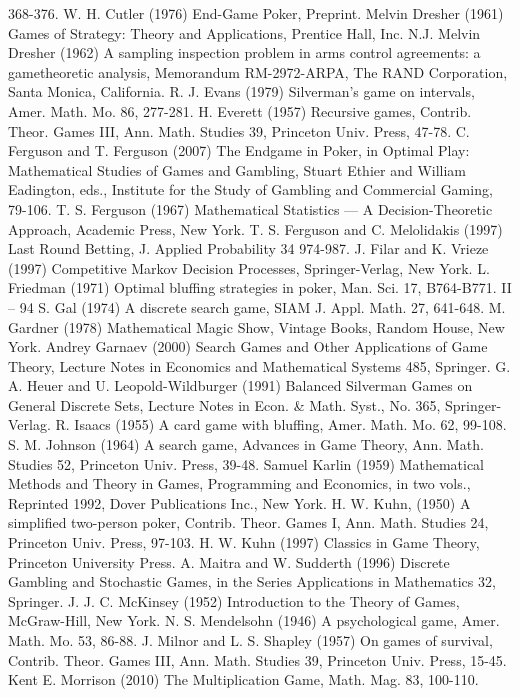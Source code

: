368-376.
W. H. Cutler (1976) End-Game Poker, Preprint.
Melvin Dresher (1961) Games of Strategy: Theory and Applications, Prentice Hall, Inc.
N.J.
Melvin Dresher (1962) A sampling inspection problem in arms control agreements: a gametheoretic
analysis, Memorandum RM-2972-ARPA, The RAND Corporation, Santa
Monica, California.
R. J. Evans (1979) Silverman’s game on intervals, Amer. Math. Mo. 86, 277-281.
H. Everett (1957) Recursive games, Contrib. Theor. Games III, Ann. Math. Studies 39,
Princeton Univ. Press, 47-78.
C. Ferguson and T. Ferguson (2007) The Endgame in Poker, in Optimal Play: Mathematical
Studies of Games and Gambling, Stuart Ethier and William Eadington, eds.,
Institute for the Study of Gambling and Commercial Gaming, 79-106.
T. S. Ferguson (1967) Mathematical Statistics — A Decision-Theoretic Approach, Academic
Press, New York.
T. S. Ferguson and C. Melolidakis (1997) Last Round Betting, J. Applied Probability 34
974-987.
J. Filar and K. Vrieze (1997) Competitive Markov Decision Processes, Springer-Verlag,
New York.
L. Friedman (1971) Optimal bluffing strategies in poker, Man. Sci. 17, B764-B771.
II – 94
S. Gal (1974) A discrete search game, SIAM J. Appl. Math. 27, 641-648.
M. Gardner (1978) Mathematical Magic Show, Vintage Books, Random House, New York.
Andrey Garnaev (2000) Search Games and Other Applications of Game Theory, Lecture
Notes in Economics and Mathematical Systems 485, Springer.
G. A. Heuer and U. Leopold-Wildburger (1991) Balanced Silverman Games on General
Discrete Sets, Lecture Notes in Econ. & Math. Syst., No. 365, Springer-Verlag.
R. Isaacs (1955) A card game with bluffing, Amer. Math. Mo. 62, 99-108.
S. M. Johnson (1964) A search game, Advances in Game Theory, Ann. Math. Studies 52,
Princeton Univ. Press, 39-48.
Samuel Karlin (1959) Mathematical Methods and Theory in Games, Programming and
Economics, in two vols., Reprinted 1992, Dover Publications Inc., New York.
H. W. Kuhn, (1950) A simplified two-person poker, Contrib. Theor. Games I, Ann. Math.
Studies 24, Princeton Univ. Press, 97-103.
H. W. Kuhn (1997) Classics in Game Theory, Princeton University Press.
A. Maitra and W. Sudderth (1996) Discrete Gambling and Stochastic Games, in the Series
Applications in Mathematics 32, Springer.
J. J. C. McKinsey (1952) Introduction to the Theory of Games, McGraw-Hill, New York.
N. S. Mendelsohn (1946) A psychological game, Amer. Math. Mo. 53, 86-88.
J. Milnor and L. S. Shapley (1957) On games of survival, Contrib. Theor. Games III, Ann.
Math. Studies 39, Princeton Univ. Press, 15-45.
Kent E. Morrison (2010) The Multiplication Game, Math. Mag. 83, 100-110.
